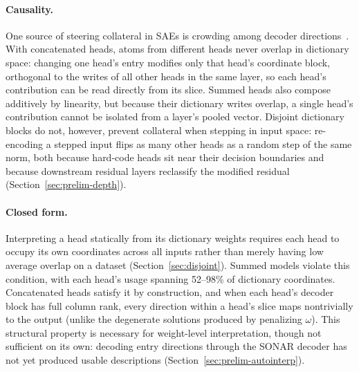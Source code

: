 \paragraph{Causality.}
One source of steering collateral in SAEs is crowding among decoder
directions~\cite{duan2026}. With concatenated heads, atoms from
different heads never overlap in dictionary space: changing one head's
entry modifies only that head's coordinate block, orthogonal to the
writes of all other heads in the same layer, so each head's contribution
can be read directly from its slice. Summed heads also compose
additively by linearity, but because their dictionary writes overlap, a
single head's contribution cannot be isolated from a layer's pooled
vector. Disjoint dictionary blocks do not, however, prevent collateral
when stepping in input space: re-encoding a stepped input flips as many
other heads as a random step of the same norm, both because hard-code
heads sit near their decision boundaries and because downstream residual
layers reclassify the modified residual (Section~\ref{sec:prelim-depth}).

\paragraph{Closed form.}
Interpreting a head statically from its dictionary weights requires each
head to occupy its own coordinates across all inputs rather than merely
having low average overlap on a dataset (Section~\ref{sec:disjoint}).
Summed models violate this condition, with each head's usage spanning
52--98\% of dictionary coordinates. Concatenated heads satisfy it by
construction, and when each head's decoder block has full column rank,
every direction within a head's slice maps nontrivially to the output
(unlike the degenerate solutions produced by penalizing $\omega$). This
structural property is necessary for weight-level interpretation, though
not sufficient on its own: decoding entry directions through the SONAR
decoder has not yet produced usable descriptions
(Section~\ref{sec:prelim-autointerp}).

